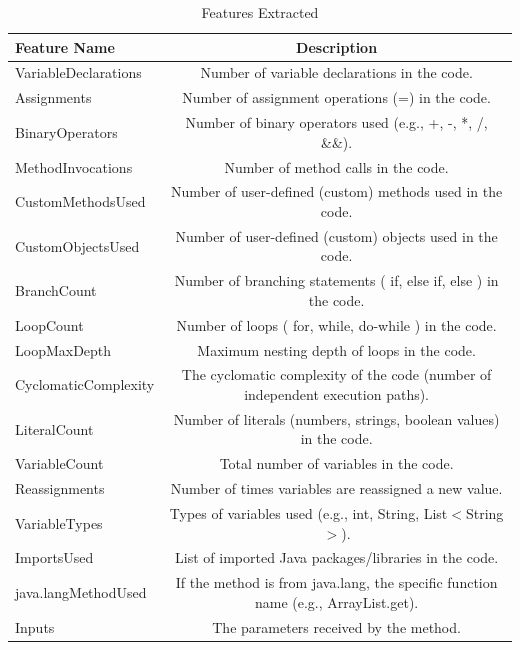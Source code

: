 \begin{table}[htbp]
\centering
\caption{Features Extracted}
\label{tab:features_extracted}
\begin{tabular}{||l|c||}
\hline\hline
\textbf{Feature Name} & \textbf{Description} \\
\hline\hline
VariableDeclarations & Number of variable declarations in the code. \\
\hline
Assignments & Number of assignment operations (=) in the code. \\
\hline
BinaryOperators & Number of binary operators used (e.g., +, -, *, /, \&\&). \\
\hline
MethodInvocations & Number of method calls in the code. \\
\hline
CustomMethodsUsed & Number of user-defined (custom) methods used in the code. \\
\hline
CustomObjectsUsed & Number of user-defined (custom) objects used in the code. \\
\hline
BranchCount & Number of branching statements ( if, else if, else ) in the code. \\
\hline
LoopCount & Number of loops ( for, while, do-while ) in the code. \\
\hline
LoopMaxDepth & Maximum nesting depth of loops in the code. \\
\hline
CyclomaticComplexity & The cyclomatic complexity of the code (number of independent execution paths). \\
\hline
LiteralCount & Number of literals (numbers, strings, boolean values) in the code. \\
\hline
VariableCount & Total number of variables in the code. \\
\hline
Reassignments & Number of times variables are reassigned a new value. \\
\hline
VariableTypes & Types of variables used (e.g., int, String, List$<$String$>$). \\
\hline
ImportsUsed & List of imported Java packages/libraries in the code. \\
\hline
java.langMethodUsed & If the method is from java.lang, the specific function name (e.g., ArrayList.get). \\
\hline
Inputs & The parameters received by the method. \\
\hline\hline
\end{tabular}
\end{table}